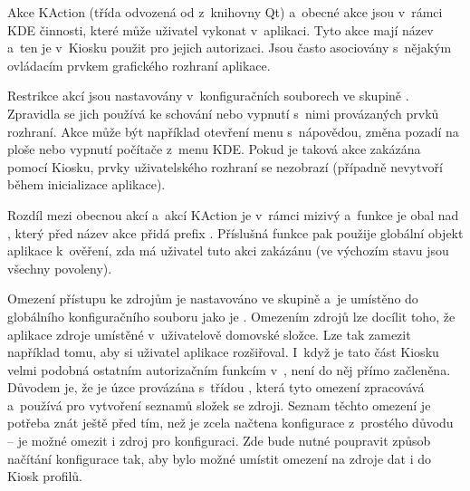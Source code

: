 Akce KAction (třída  odvozená od  z~knihovny Qt) a~obecné akce jsou v~rámci KDE činnosti, které může uživatel vykonat v~aplikaci. Tyto akce mají název a~ten je v~Kiosku použit pro jejich autorizaci. Jsou často asociovány s~nějakým ovládacím prvkem grafického rozhraní aplikace.

Restrikce akcí jsou nastavovány v~konfiguračních souborech ve skupině \linebreak{}. Zpravidla se jich používá ke schování nebo vypnutí s~nimi provázaných prvků rozhraní. Akce může být například otevření menu s~nápovědou, změna pozadí na ploše nebo vypnutí počítače z~menu KDE. Pokud je taková akce zakázána pomocí Kiosku, prvky uživatelského rozhraní se nezobrazí (případně nevytvoří během inicializace aplikace).

Rozdíl mezi obecnou akcí a~akcí KAction je v~rámci  mizivý a~funkce \linebreak{} je obal nad , který před název akce přidá prefix . Příslušná funkce pak použije globální  objekt aplikace k~ověření, zda má uživatel tuto akci zakázánu (ve výchozím stavu jsou všechny povoleny).

Omezení přístupu ke zdrojům je nastavováno ve skupině  a~je umístěno do globálního konfiguračního souboru jako je . Omezením zdrojů lze docílit toho, že aplikace  zdroje umístěné v~uživatelově domovské složce. Lze tak zamezit například tomu, aby si uživatel aplikace rozšiřoval. I~když je tato část Kiosku velmi podobná ostatním autorizačním funkcím v~, není do něj přímo začleněna. Důvodem je, že je úzce provázána s~třídou , která tyto omezení zpracovává a~používá pro vytvoření seznamů složek se zdroji. Seznam těchto omezení je potřeba znát ještě před tím, než je zcela načtena konfigurace z~prostého důvodu -- je možné omezit i zdroj pro konfiguraci. Zde bude nutné poupravit způsob načítání konfigurace tak, aby bylo možné umístit omezení na zdroje dat i do Kiosk profilů.


